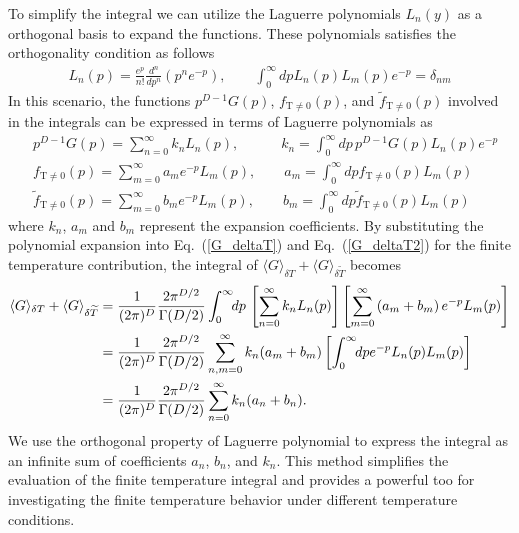 \documentclass[sn-mathphys,Numbered]{sn-jnl}
\begin{document}
To simplify the integral we can utilize the Laguerre polynomials $L_n(y)$ as a orthogonal basis to expand the  functions. These polynomials satisfies the orthogonality condition as follows
\begin{align}
L_n(p)=\frac{e^p}{n!}\frac{d^n}{dp^n}\left(p^ne^{-p}\right),\qquad\int_0^\infty\!\!dpL_n(p)L_m(p)e^{-p}=\delta_{nm}
\end{align}
In this scenario, the functions $p^{D-1}G(p)$, $f_\mathrm{T\neq0}(p)$, and $\widetilde f_\mathrm{T\neq0}(p)$ involved in the integrals can be expressed in terms of Laguerre polynomials as
\begin{align}
&p^{D-1}G(p)=\sum_{n=0}^\infty k_nL_n(p),\qquad\quad k_n=\int_0^\infty\!\!dp\,p^{D-1}G(p)L_n(p)e^{-p}\\
&f_\mathrm{T\neq0}(p)=\sum_{m=0}^\infty a_m e^{-p}L_m(p),\qquad a_m=\int_0^\infty\!\!dp f_\mathrm{T\neq0}(p)L_m(p)\\
&\widetilde f_\mathrm{T\neq0}(p)=\sum_{m=0}^\infty b_m e^{-p}L_m(p),\qquad b_m=\int_0^\infty\!\!dp \widetilde f_\mathrm{T\neq0}(p)L_m(p)
\end{align}
where $k_n$, $a_m$ and $b_m$ represent the expansion coefficients. By substituting the polynomial expansion into Eq.~(\ref{G_deltaT}) and Eq.~(\ref{G_deltaT2}) for the finite temperature contribution, the integral of $\langle G\rangle_{\delta T}+\langle G\rangle_{\delta \widetilde T}$ becomes
\begin{align}
\langle G\rangle_{\delta T}+\langle G\rangle_{\delta \widetilde T}&=\frac{1}{(2\pi)^D}\frac{2\pi^{D/2}}{\Gamma(D/2)}\int^{\infty}_{0}\!\!dp\,\left[\sum_{n=0}^\infty k_nL_n(p)\right]\left[\sum_{m=0}^\infty \left(a_m+b_m\right) e^{-p}L_m(p)\right]\notag\\
&=\frac{1}{(2\pi)^D}\frac{2\pi^{D/2}}{\Gamma(D/2)}\sum_{n,m=0}^\infty k_n(a_m+b_m)\left[\int_0^\infty\!\!dp e^{-p}L_n(p)L_m(p)\right]\notag\\
&=\frac{1}{(2\pi)^D}\frac{2\pi^{D/2}}{\Gamma(D/2)}\sum^\infty_{n=0}k_n(a_n+b_n).\label{Sum000}
\end{align}
We use the orthogonal property of Laguerre polynomial to express the integral as an infinite sum of coefficients $a_n$, $b_n$, and $k_n$. This method simplifies the evaluation of the finite temperature integral and provides a powerful too for investigating the finite temperature behavior under different temperature conditions.

\end{document}
